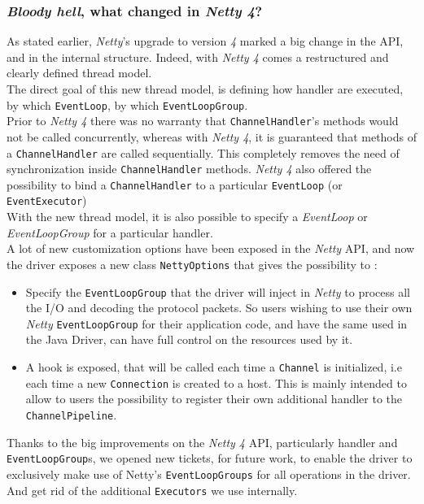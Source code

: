 \documentclass[a4paper]{report}
\begin{document}
\subsubsection{\emph{Bloody hell}, what changed in \emph{Netty 4}?}
As stated earlier, \emph{Netty}'s upgrade to version \emph{4} marked a big change in the API, and in the internal structure. Indeed, with \emph{Netty 4} comes a restructured and clearly defined thread model.\\
The direct goal of this new thread model, is defining how handler are executed, by which \verb;EventLoop;, by which \verb;EventLoopGroup;. \\
Prior to \emph{Netty 4} there was no warranty that \verb;ChannelHandler;'s methods would not be called concurrently, whereas with \emph{Netty 4}, it is guaranteed that methods of a \verb;ChannelHandler; are called sequentially. This completely removes the need of synchronization inside \verb;ChannelHandler; methods. \emph{Netty 4} also offered the possibility to bind a \verb;ChannelHandler; to a particular \verb;EventLoop; (or \verb;EventExecutor;)\\
With the new thread model, it is also possible to specify a \emph{EventLoop} or \emph{EventLoopGroup} for a particular handler.\\
A lot of new customization options have been exposed in the \emph{Netty} API, and now the driver exposes a new class \verb;NettyOptions; that gives the possibility to : 
\begin{itemize}
   \item Specify the \verb;EventLoopGroup; that the driver will inject in \emph{Netty} to process all the I/O and decoding the protocol packets. So users wishing to use their own \emph{Netty} \verb;EventLoopGroup; for their application code, and have the same used in the Java Driver, can have full control on the resources used by it.
   \item A hook is exposed, that will be called each time a \verb;Channel; is initialized, i.e each time a new \verb;Connection; is created to a host. This is mainly intended to allow to users the possibility to register their own additional handler to the \verb;ChannelPipeline;.
\end{itemize}
Thanks to the big improvements on the \emph{Netty 4} API, particularly handler and \verb;EventLoopGroup;s, we opened new tickets, for future work, to enable the driver to exclusively make use of Netty's \verb;EventLoopGroups; for all operations in the driver. And get rid of the additional \verb;Executors; we use internally.
\end{document}
